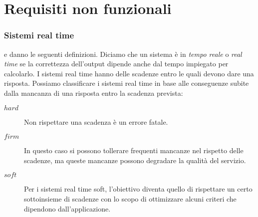 \section{Requisiti non funzionali}

\subsubsection{Sistemi real time}
\cite{RealTime} e \cite{WikiRealTime} danno le seguenti definizioni. Diciamo che un sistema \`e in \emph{tempo reale} o \emph{real time} se la correttezza dell'output dipende anche dal tempo impiegato per calcolarlo. I sistemi real time hanno delle scadenze entro le quali devono dare una risposta. Possiamo classificare i sistemi real time in base alle conseguenze subite dalla mancanza di una risposta entro la scadenza prevista:
\begin{description}
  \item[$hard$]
    Non rispettare una scadenza \`e un errore fatale. 
  \item[$firm$]
    In questo caso si possono tollerare frequenti mancanze nel rispetto delle scadenze, ma queste mancanze possono degradare la qualit\`a del servizio.
  \item[$soft$]
    Per i sistemi real time soft, l'obiettivo diventa quello di rispettare un certo sottoinsieme di scadenze con lo scopo di ottimizzare alcuni criteri che dipendono dall'applicazione. 
\end{description}




